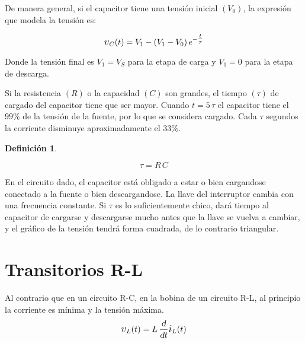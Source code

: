 \documentclass[a5paper,12pt,twoside]{book}
\newtheorem{defn}{{Definición}}[chapter]
\begin{document}
\begin{center}
    \def\svgwidth{0.8\linewidth}
    
\end{center}

De manera general, si el capacitor tiene una tensión inicial $(V_0)$, la expresión que modela la tensión es:

\begin{equation*}
    \voltage_C(t) = V_1 - \bb{V_1 - V_0} e^{-\tfrac{t}{\tau}}
\end{equation*}

Donde la tensión final es $V_1 = V_S$ para la etapa de carga y $V_1 = 0$ para la etapa de descarga.

Si la resistencia $(R)$ o la capacidad $(C)$ son grandes, el tiempo $(\tau)$ de cargado del capacitor tiene que ser mayor. Cuando $t = 5 \, \tau$ el capacitor tiene el $99\%$ de la tensión de la fuente, por lo que se considera cargado. Cada $\tau$ segundos la corriente disminuye aproximadamente el $33\%$.

\begin{mdframed}[style=MyFrame1]
    \begin{defn}
    \end{defn}
    \begin{equation*}
        \tau = R \, C
    \end{equation*}
\end{mdframed}

En el circuito dado, el capacitor está obligado a estar o bien cargandose conectado a la fuente o bien descargandose.
La llave del interruptor cambia con una frecuencia constante.
Si $\tau$ es lo suficientemente chico, dará tiempo al capacitor de cargarse y descargarse mucho antes que la llave se vuelva a cambiar, y el gráfico de la tensión tendrá forma cuadrada, de lo contrario triangular.

\begin{center}
    \def\svgwidth{\linewidth}
    
\end{center}


\section{Transitorios R-L}

Al contrario que en un circuito R-C, en la bobina de un circuito R-L, al principio la corriente es mínima y la tensión máxima.
\begin{equation*}
    \voltage_L(t) = L \, \frac{\dif}{\dif t} \current_L(t)
\end{equation*}
\end{document}
